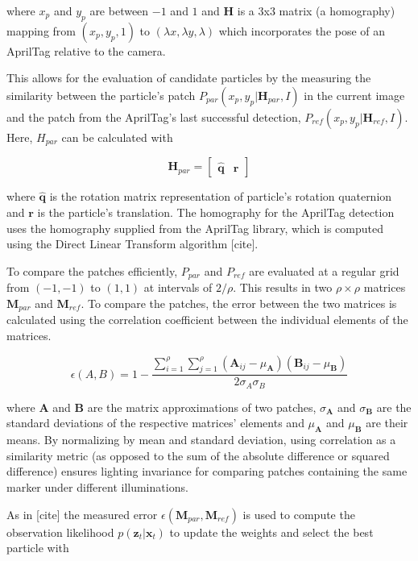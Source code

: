 \documentclass[letterpaper, 10 pt, conference]{ieeeconf}
\renewcommand{\vec}[1]{\boldsymbol{#1}}
\begin{document}
where $x_p$ and $y_p$ are between $-1$ and $1$ and $\vec{H}$ is a 3x3 matrix (a homography) mapping from $(x_p, y_p, 1)$ to $(\lambda x, \lambda y, \lambda)$ which incorporates the pose of an AprilTag relative to the camera. 


This allows for the evaluation of candidate particles by the measuring the similarity between the particle's patch $P_{par}(x_p,y_p|\vec{H}_{par},I)$ in the current image and the patch from the AprilTag's last successful detection, $P_{ref}(x_p,y_p|\vec{H}_{ref},I)$. Here, $H_{par}$ can be calculated with

\begin{equation} \label{eq:particle_homography}
\vec{H}_{par} = \begin{bmatrix}
		\widehat{\vec{q}} & \vec{r}
	\end{bmatrix}
\end{equation}

where $\widehat{\vec{q}}$ is the rotation matrix representation of particle's rotation quaternion and $\vec{r}$ is the particle's translation. The homography for the AprilTag detection uses the homography supplied from the AprilTag library, which is computed using the Direct Linear Transform algorithm [cite]. 


To compare the patches efficiently, $P_{par}$ and $P_{ref}$ are evaluated at a regular grid from $(-1, -1)$ to $(1, 1)$ at intervals of $2 / \rho$. This results in two $\rho \times \rho$ matrices $\vec{M}_{par}$ and $\vec{M}_{ref}$. To compare the patches, the error between the two  matrices is calculated using the correlation coefficient between the individual elements of the matrices.

\begin{equation}
	\epsilon(A, B) = 1 - \frac{\sum_{i=1}^{\rho} \sum_{j=1}^{\rho} (\vec{A}_{ij} - \mu_{\vec{A}})(\vec{B}_{ij} - \mu_{\vec{B}}) }{2\sigma_{A} \sigma_{B}}
\end{equation}

where $\vec{A}$ and $\vec{B}$ are the matrix approximations of two patches, $\sigma_{\vec{A}}$ and $\sigma_{\vec{B}}$ are the standard deviations of the respective matrices' elements and $\mu_{\vec{A}}$ and $\mu_{\vec{B}}$ are their means. By normalizing by mean and standard deviation, using correlation as a similarity metric (as opposed to the sum of the absolute difference or squared difference) ensures lighting invariance for comparing patches containing the same marker under different illuminations.


As in [cite] the measured error $\epsilon(\vec{M}_{par}, \vec{M}_{ref})$ is used to compute the observation likelihood $p(\vec{z}_t|\vec{x}_t)$ to update the weights and select the best particle with
\end{document}
